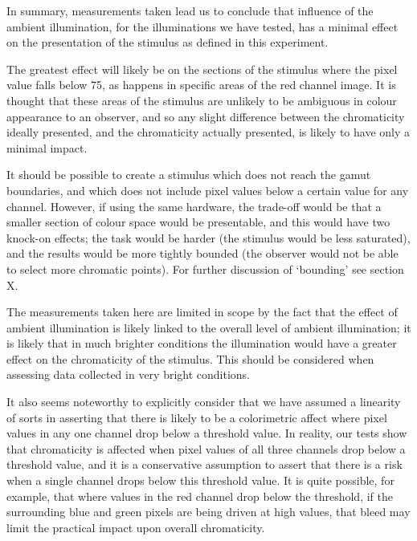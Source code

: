 In summary, measurements taken lead us to conclude that influence of the ambient illumination, for the illuminations we have tested, has a minimal effect on the presentation of the stimulus as defined in this experiment. 

The greatest effect will likely be on the sections of the stimulus where the pixel value falls below 75, as happens in specific areas of the red channel image. It is thought that these areas of the stimulus are unlikely to be ambiguous in colour appearance to an observer, and so any slight difference between the chromaticity ideally presented, and the chromaticity actually presented, is likely to have only a minimal impact. 

It should be possible to create a stimulus which does not reach the gamut boundaries, and which does not include pixel values below a certain value for any channel. However, if using the same hardware, the trade-off would be that a smaller section of colour space would be presentable, and this would have two knock-on effects; the task would be harder (the stimulus would be less saturated), and the results would be more tightly bounded (the observer would not be able to select more chromatic points). For further discussion of `bounding' see section X. %

The measurements taken here are limited in scope by the fact that the effect of ambient illumination is likely linked to the overall level of ambient illumination; it is likely that in much brighter conditions the illumination would have a greater effect on the chromaticity of the stimulus. This should be considered when assessing data collected in very bright conditions.

It also seems noteworthy to explicitly consider that we have assumed a linearity of sorts in asserting that there is likely to be a colorimetric affect where pixel values in any one channel drop below a threshold value. In reality, our tests show that chromaticity is affected when pixel values of all three channels drop below a threshold value, and it is a conservative assumption to assert that there is a risk when a single channel drops below this threshold value. It is quite possible, for example, that where values in the red channel drop below the threshold, if the surrounding blue and green pixels are being driven at high values, that bleed may limit the practical impact upon overall chromaticity.


